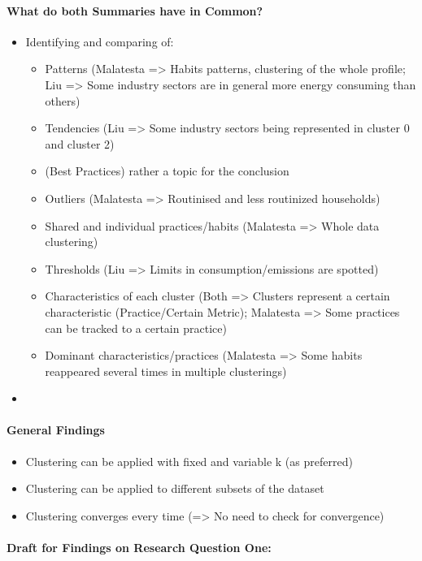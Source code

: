 \paragraph*{What do both Summaries have in Common?}
\begin{itemize}
    \item Identifying and comparing of:
    \begin{itemize}
        \item Patterns (Malatesta => Habits patterns, clustering of the whole profile; Liu => Some industry sectors are in general more energy consuming than others)
        \item Tendencies (Liu => Some industry sectors being represented in cluster 0 and cluster 2)
        \item (Best Practices) rather a topic for the conclusion
        \item Outliers (Malatesta => Routinised and less routinized households)
        \item Shared and individual practices/habits (Malatesta => Whole data clustering)
        \item Thresholds (Liu => Limits in consumption/emissions are spotted)
        \item Characteristics of each cluster (Both => Clusters represent a certain characteristic (Practice/Certain Metric); Malatesta => Some practices can be tracked to a certain practice)
        \item Dominant characteristics/practices (Malatesta => Some habits reappeared several times in multiple clusterings)
    \end{itemize}
    \item
\end{itemize}

\paragraph*{General Findings}
\begin{itemize}
    \item Clustering can be applied with fixed and variable k (as preferred)
    \item Clustering can be applied to different subsets of the dataset
    \item Clustering converges every time (=> No need to check for convergence)
\end{itemize}

\paragraph*{Draft for Findings on Research Question One:}


